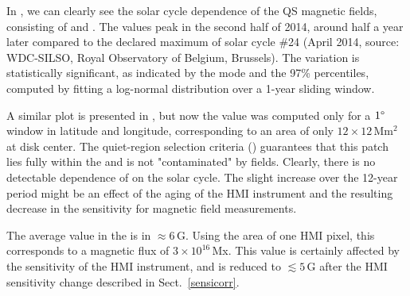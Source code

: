 \documentclass{aa}
\begin{document}
In , we can clearly see the solar cycle dependence of the 
QS
magnetic fields, consisting of \NW{} and \IN{}. The \brms{} values peak in the second half of 2014, 
around half a year
later compared to the
declared maximum of solar cycle \#24 (April 2014, source: WDC-SILSO, Royal Observatory of Belgium, Brussels). The variation is statistically significant, as indicated by the mode and the 97\% percentiles, computed by fitting a log-normal distribution over a 1-year sliding window.

A similar plot is presented in , but now the \brms{} value was computed only for a $1\degree$ window in latitude and longitude, corresponding to an area of only $12\times 12$\,Mm$^2$ at disk center. The quiet-region selection criteria () guarantees that this patch lies fully within the \IN{} and is not "contaminated" by \NW{} fields. Clearly, there is no detectable dependence of \brms{} on the solar cycle. The 
slight increase over the 12-year period might be an effect of the aging of the HMI instrument and the resulting decrease in the sensitivity for magnetic field measurements.

The average \brms{} value in the \IN{} is in $\approx6$\,G. Using the area of one HMI pixel, this corresponds to a magnetic flux of $3\times 10^{16}$\,Mx. 
This value is certainly affected by the sensitivity of the HMI instrument, and is reduced to $\lesssim5$\,G after the HMI sensitivity change described in Sect.~\ref{sensicorr}.




\end{document}

